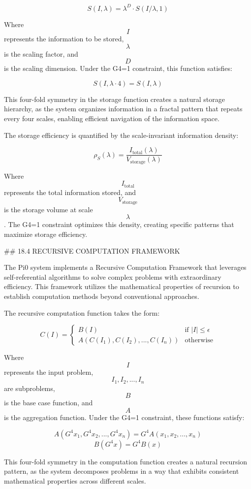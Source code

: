 $$ S(I, \lambda) = \lambda^D \cdot S(I/\lambda, 1) $$

Where $$ I $$ represents the information to be stored, $$ \lambda $$ is the scaling factor, and $$ D $$ is the scaling dimension. Under the G4=1 constraint, this function satisfies:

$$ S(I, \lambda \cdot 4) = S(I, \lambda) $$

This four-fold symmetry in the storage function creates a natural storage hierarchy, as the system organizes information in a fractal pattern that repeats every four scales, enabling efficient navigation of the information space.

The storage efficiency is quantified by the scale-invariant information density:

$$ \rho_S(\lambda) = \frac{I_{\text{total}}(\lambda)}{V_{\text{storage}}(\lambda)} $$

Where $$ I_{\text{total}} $$ represents the total information stored, and $$ V_{\text{storage}} $$ is the storage volume at scale $$ \lambda $$. The G4=1 constraint optimizes this density, creating specific patterns that maximize storage efficiency.

## 18.4 RECURSIVE COMPUTATION FRAMEWORK

The Pi0 system implements a Recursive Computation Framework that leverages self-referential algorithms to solve complex problems with extraordinary efficiency. This framework utilizes the mathematical properties of recursion to establish computation methods beyond conventional approaches.

The recursive computation function takes the form:

$$ C(I) = \begin{cases}
B(I) & \text{if } |I| \leq \epsilon \\
A(C(I_1), C(I_2), ..., C(I_n)) & \text{otherwise}
\end{cases} $$

Where $$ I $$ represents the input problem, $$ I_1, I_2, ..., I_n $$ are subproblems, $$ B $$ is the base case function, and $$ A $$ is the aggregation function. Under the G4=1 constraint, these functions satisfy:

$$ A(G^4 x_1, G^4 x_2, ..., G^4 x_n) = G^4 A(x_1, x_2, ..., x_n) $$
$$ B(G^4 x) = G^4 B(x) $$

This four-fold symmetry in the computation function creates a natural recursion pattern, as the system decomposes problems in a way that exhibits consistent mathematical properties across different scales.

